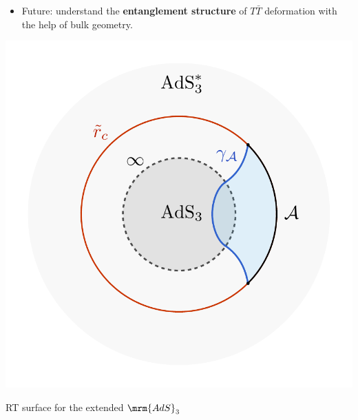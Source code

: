 \documentclass[10pt]{article}
\newcommand{\citations}[1]{{\footnotesize#1\par}}
\newcommand{\TTbar}{\texorpdfstring{\ensuremath{T\bar{T}}}{TTbar}\xspace}
\begin{document}
\begin{multicols}{3}
\begin{itemize}
	\item Future: understand the \textbf{entanglement structure} of \TTbar deformation with the help of bulk geometry.
	\begin{flushright}
		\vspace{-.5\baselineskip}
		\citations{
			\textcite{Lewkowycz:2019xse}
		}
	\end{flushright}
\end{itemize}
\centering\vspace{-.8\baselineskip}
\includegraphics[width=.6\linewidth]{img/RT-AdS.pdf}

\vspace{-1.2\baselineskip}
{\footnotesize RT surface for the extended $\mrm{AdS}_3$}

%
%

\end{multicols}
\end{document}
